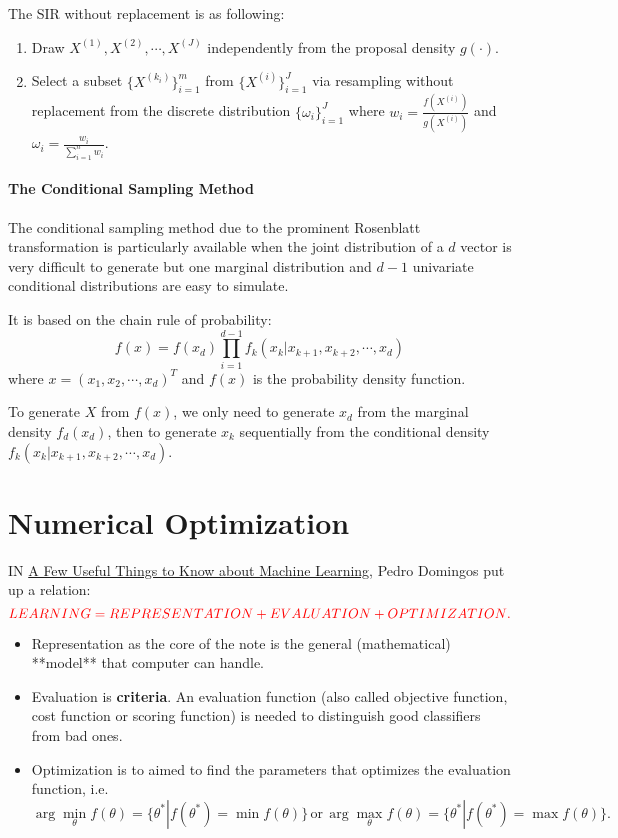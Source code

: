 \documentclass[titlestyle=hang,11pt]{elegantbook}
\begin{document}
The SIR without replacement is as following:
\begin{enumerate}
 	\item Draw $X^{(1)},X^{(2)},\cdots,X^{(J)}$ independently from the proposal density $g(\cdot)$.
 	\item Select a subset $\{X^{(k_i)}\}_{i=1}^{m}$ from $\{X^{(i)}\}_{i=1}^{J}$ via resampling without replacement from the discrete distribution $\{\omega_i\}_{i=1}^{J}$
    where $w_i=\frac{f(X^{(i)})}{g(X^{(i)})}$ and $\omega_i=\frac{w_i}{\sum_{i=1}^{n}w_i}$.
\end{enumerate}

\subsubsection{The Conditional Sampling Method}

The conditional sampling method due to the prominent Rosenblatt transformation is particularly available
when the joint distribution of a $d$ vector is very difficult to generate but one marginal distribution and $d-1$ univariate conditional distributions are easy to simulate.

It is based on the chain rule of probability:
$$ f(x)=f(x_d)\prod_{i=1}^{d-1}f_{k}( x_k |x_{k+1}, x_{k+2},\cdots, x_d ) $$
where $x=(x_1,x_2,\cdots, x_d)^{T}$ and $f(x)$ is the probability density function.

To generate $X$ from $f(x)$, we only need to generate $x_d$ from the marginal
density $f_d(x_d)$, then to generate $x_k$ sequentially from the conditional density
$f_k(x_k|x_{k+1}, x_{k+2}, \cdots, x_d)$.


\chapter{Numerical Optimization}

IN \href{https://homes.cs.washington.edu/~pedrod/papers/cacm12.pdf}{A Few Useful Things to Know about Machine Learning}, Pedro Domingos put up a relation:
$$\color{red}{LEARNING = REPRESENTATION + EVALUATION + OPTIMIZATION}.$$

\begin{itemize}
\item Representation as the core of the note is the general (mathematical) **model** that computer can handle.
\item Evaluation is  \textbf{criteria}. An evaluation function (also called objective function, cost function or scoring function) is needed to distinguish good classifiers from bad ones.
\item Optimization is to aimed to find the parameters that optimizes the evaluation function, i.e.
    $$ \arg\min_{\theta} f(\theta)=\{\theta^*|f(\theta^*)=\min f(\theta)\}\,\text{or}\,\arg\max_{\theta}f(\theta)=\{\theta^*|f(\theta^*)=\max f(\theta)\}. $$
\end{itemize}
\end{document}
